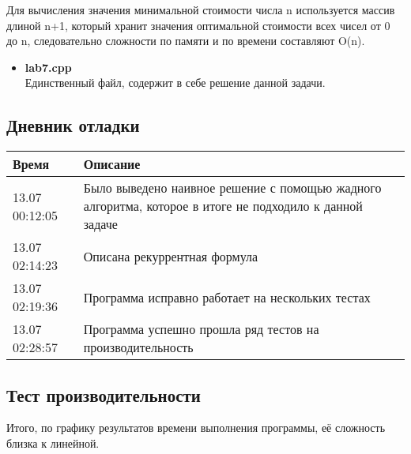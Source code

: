 \documentclass[12pt]{article}
\begin{document}
Для вычисления значения минимальной стоимости числа n используется массив длиной n+1, который хранит значения оптимальной стоимости всех чисел от 0 до n, следовательно сложности по памяти и по времени составляют O(n). 

\begin{itemize}
    \item \textbf{lab7.cpp}\\ 
    Единственный файл, содержит в себе решение данной задачи.
\end{itemize}

\subsection*{Дневник отладки}
\smallbreak
\noindent
\begin{tabular}{|l|p{13.2cm}|P{0.675\linewidth}|}
    \hline
    Время&  Описание \\ \hline
    13.07 00:12:05& Было выведено наивное решение с помощью жадного алгоритма, которое в итоге не подходило к данной задаче\\ \hline
    13.07 02:14:23& Описана рекуррентная формула\\ \hline
    13.07 02:19:36& Программа исправно работает на нескольких тестах\\ \hline
    13.07 02:28:57& Программа успешно прошла ряд тестов на производительность\\ \hline
\end{tabular}
\smallbreak
\subsection*{Тест производительности}

Итого, по графику результатов времени выполнения программы, её сложность близка к линейной.
\\

\end{document}
